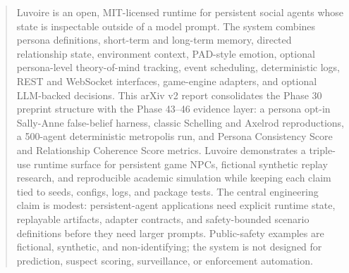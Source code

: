 \begin{abstract}
Luvoire is an open, MIT-licensed runtime for persistent social agents whose state is inspectable outside of a model prompt. The system combines persona definitions, short-term and long-term memory, directed relationship state, environment context, PAD-style emotion, optional persona-level theory-of-mind tracking, event scheduling, deterministic logs, REST and WebSocket interfaces, game-engine adapters, and optional LLM-backed decisions. This arXiv v2 report consolidates the Phase 30 preprint structure with the Phase 43--46 evidence layer: a persona opt-in Sally-Anne false-belief harness, classic Schelling and Axelrod reproductions, a 500-agent deterministic metropolis run, and Persona Consistency Score and Relationship Coherence Score metrics. Luvoire demonstrates a triple-use runtime surface for persistent game NPCs, fictional synthetic replay research, and reproducible academic simulation while keeping each claim tied to seeds, configs, logs, and package tests. The central engineering claim is modest: persistent-agent applications need explicit runtime state, replayable artifacts, adapter contracts, and safety-bounded scenario definitions before they need larger prompts. Public-safety examples are fictional, synthetic, and non-identifying; the system is not designed for prediction, suspect scoring, surveillance, or enforcement automation.
\end{abstract}
